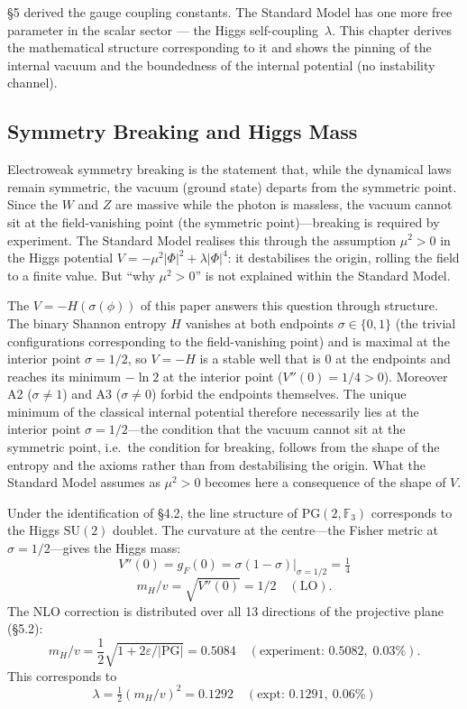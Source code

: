 \documentclass[12pt,a4paper]{article}
\begin{document}
\S5 derived the gauge coupling constants. The Standard Model has one more
free parameter in the scalar sector --- the Higgs self-coupling~$\lambda$.
This chapter derives the mathematical structure corresponding to it and shows the pinning of the internal vacuum and the boundedness of the internal potential (no instability channel).

\subsection{Symmetry Breaking and Higgs Mass}\label{sec:higgs-mass}

Electroweak symmetry breaking is the statement that, while the dynamical laws remain symmetric, the vacuum (ground state) departs from the symmetric point. Since the $W$ and $Z$ are massive while the photon is massless, the vacuum cannot sit at the field-vanishing point (the symmetric point)---breaking is required by experiment. The Standard Model realises this through the assumption $\mu^2 > 0$ in the Higgs potential $V = -\mu^2|\Phi|^2 + \lambda|\Phi|^4$: it destabilises the origin, rolling the field to a finite value. But ``why $\mu^2 > 0$'' is not explained within the Standard Model.

The $V = -H(\sigma(\phi))$ of this paper answers this question through structure. The binary Shannon entropy $H$ vanishes at both endpoints $\sigma \in \{0,1\}$ (the trivial configurations corresponding to the field-vanishing point) and is maximal at the interior point $\sigma = 1/2$, so $V = -H$ is a stable well that is 0 at the endpoints and reaches its minimum $-\ln 2$ at the interior point ($V''(0) = 1/4 > 0$). Moreover A2 ($\sigma \neq 1$) and A3 ($\sigma \neq 0$) forbid the endpoints themselves. The unique minimum of the classical internal potential therefore necessarily lies at the interior point $\sigma = 1/2$---the condition that the vacuum cannot sit at the symmetric point, i.e.\ the condition for breaking, follows from the shape of the entropy and the axioms rather than from destabilising the origin. What the Standard Model assumes as $\mu^2 > 0$ becomes here a consequence of the shape of $V$.

Under the identification of \S4.2, the line structure of $\mathrm{PG}(2,\mathbb{F}_3)$
corresponds to the Higgs $\mathrm{SU}(2)$ doublet. The curvature at the
centre---the Fisher metric at $\sigma = 1/2$---gives the Higgs mass:
\[V''(0) = g_F(0) = \sigma(1-\sigma)\big|_{\sigma=1/2} = \tfrac{1}{4}\]
\begin{equation}
  m_H/v = \sqrt{V''(0)} = 1/2 \quad (\mathrm{LO}).
\end{equation}
The NLO correction is distributed over all 13 directions of the projective plane (\S5.2):
\begin{equation}\label{eq:higgs}
  m_H/v = \frac{1}{2}\sqrt{1 + 2\varepsilon/|\mathrm{PG}|}
  = 0.5084 \quad (\text{experiment: } 0.5082,\; 0.03\%).
\end{equation}
This corresponds to
\[\lambda = \tfrac{1}{2}(m_H/v)^2 = 0.1292\quad(\text{expt: } 0.1291,\ 0.06\%)\]
\end{document}
